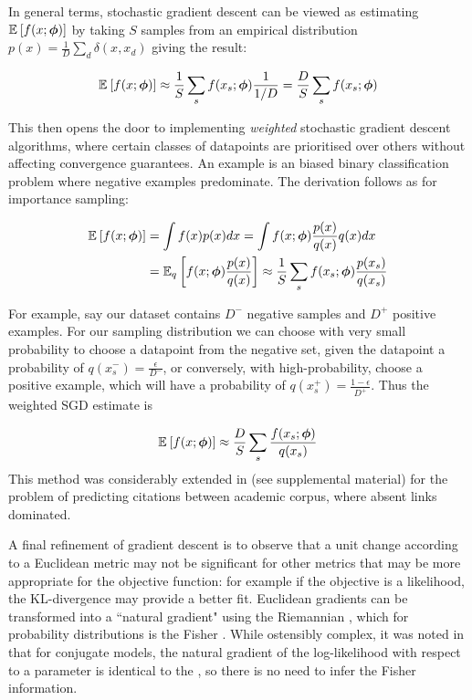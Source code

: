 In general terms, stochastic gradient descent can be viewed as estimating $\ex{f(x; \param)}{}$ by taking $S$ samples from an empirical distribution $p(x) = \frac{1}{D} \sum_d \delta(x, x_d)$ giving the result:

\begin{align*}
\ex{f(x; \param)}{} \approx \frac{1}{S} \sum_s f(x_s; \param) \frac{1}{1/D} = \frac{D}{S} \sum_s f(x_s; \param)
\end{align*}

This then opens the door to implementing \emph{weighted} stochastic gradient descent algorithms, where certain classes of datapoints are prioritised over others without affecting convergence guarantees. An example is an biased binary classification problem where negative examples predominate. The derivation follows as for importance sampling:

\begin{align*}
\ex{f(x; \param)}{} 
& = \int f(x)p(x)dx = \int f(x;\param) \frac{p(x)}{q(x)} q(x) dx \\
& = \ex{f(x; \param)  \frac{p(x)}{q(x)}}{q} \approx \oneover{S} \sum_s f(x_s; \param) \frac{p(x_s)}{q(x_s)}
\end{align*}


For example, say our dataset contains $D^-$ negative samples and $D^+$ positive examples. For our sampling distribution we can choose with very small probability to choose a datapoint from the negative set, given the datapoint a probability of $q(x^-_s) = \frac{\epsilon}{D^-}$, or conversely, with high-probability, choose a positive example, which will have a probability of $q(x_s^+) = \frac{1 - \epsilon}{D^+}$. Thus the weighted SGD estimate is

\begin{align}
\ex{f(x;\param)}{} \approx \frac{D}{S} \sum_s \frac{f(x_s; \param)}{q(x_s)}
\end{align}
This method was considerably extended in \cite{Gopalan2013b} (see supplemental material) for the problem of predicting citations between academic corpus, where absent links dominated.

A final refinement of gradient descent is to observe that a unit change according to a Euclidean metric may not be significant for other metrics that may be more appropriate for the objective function: for example if the objective is a likelihood, the KL-divergence may provide a better fit. Euclidean gradients can be transformed into a ``natural gradient" using the Riemannian \fixme{ }, which for probability distributions is the Fisher \fixme { }. While ostensibly complex, it was noted in\cite{Hoffman2012} that for conjugate models, the natural gradient of the log-likelihood with respect to a parameter is identical to the \fixme{ }, so there is no need to infer the Fisher information.



